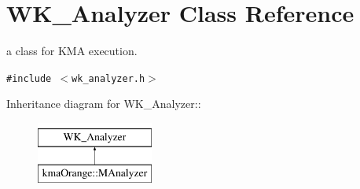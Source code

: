 \hypertarget{classWK__Analyzer}{
\section{WK\_\-Analyzer Class Reference}
\label{classWK__Analyzer}
}
a class for KMA execution.  


{\tt \#include $<$wk\_\-analyzer.h$>$}

Inheritance diagram for WK\_\-Analyzer::\begin{figure}[H]
\begin{center}
\leavevmode
\includegraphics[height=2cm]{classWK__Analyzer}
\end{center}
\end{figure}
